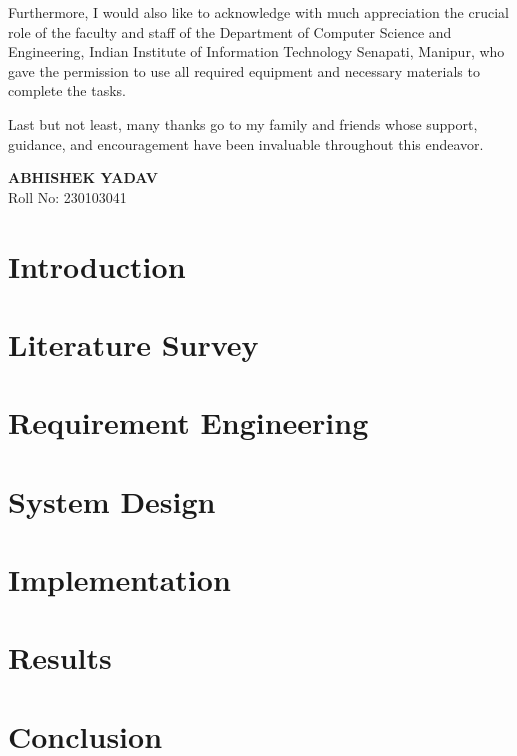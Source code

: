 \documentclass[a4paper, 11pt, oneside]{report}
\begin{document}
	Furthermore, I would also like to acknowledge with much appreciation the crucial role of the faculty and staff of the Department of Computer Science and Engineering, Indian Institute of Information Technology Senapati, Manipur, who gave the permission to use all required equipment and necessary materials to complete the tasks. 
	
	Last but not least, many thanks go to my family and friends whose support, guidance, and encouragement have been invaluable throughout this endeavor.
	
	\vspace{1cm}
	\begin{flushright}
	    \textbf{ABHISHEK YADAV} \\
	    Roll No: 230103041
	\end{flushright}
	
	\vspace{1cm}
	
	\tableofcontents
	\listoffigures
        \listoftables
	\chapter{Introduction}
	
        \chapter{Literature Survey}
        
        \chapter{Requirement Engineering}
        
        \chapter{System Design}
        
        \chapter{Implementation}
        
        \chapter{Results}
        
        \chapter{Conclusion}
        
        
        
	
        
	
	
	
	
\end{document}
